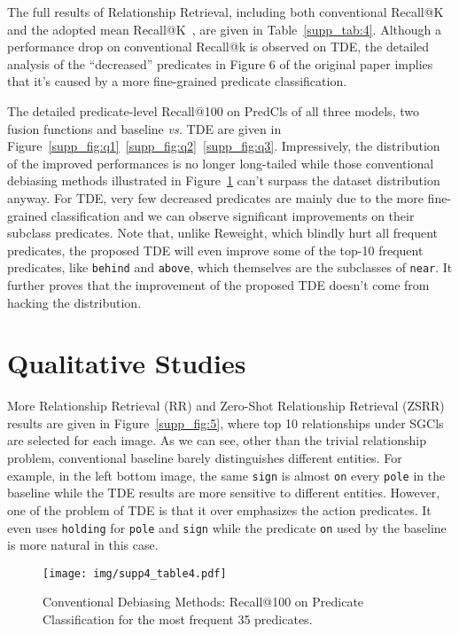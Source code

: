 \documentclass[10pt,twocolumn,letterpaper]{article}
\begin{document}
The full results of Relationship Retrieval, including both conventional Recall@K and the adopted mean Recall@K~\cite{tang2019learning, chen2019knowledge}, are given in Table~\ref{supp_tab:4}. Although a performance drop on conventional Recall@k is observed on TDE, the detailed analysis of the ``decreased'' predicates in Figure 6 of the original paper implies that it's caused by a more fine-grained predicate classification. 

The detailed predicate-level Recall@100 on PredCls of all three models, two fusion functions and baseline \textit{vs.} TDE are given in Figure~\ref{supp_fig:q1}~\ref{supp_fig:q2}~\ref{supp_fig:q3}. Impressively, the distribution of the improved performances is no longer long-tailed while those conventional debiasing methods illustrated in Figure~\ref{supp_fig:q4} can't surpass the dataset distribution anyway. For TDE, very few decreased predicates are mainly due to the more fine-grained classification and we can observe significant improvements on their subclass predicates. Note that, unlike Reweight, which blindly hurt all frequent predicates, the proposed TDE will even improve some of the top-10 frequent predicates, like \texttt{behind} and \texttt{above}, which themselves are the subclasses of \texttt{near}. It further proves that the improvement of the proposed TDE doesn't come from hacking the distribution.

\section{Qualitative Studies}
\label{sec:qualitative}
More Relationship Retrieval (RR) and Zero-Shot Relationship Retrieval (ZSRR) results are given in Figure~\ref{supp_fig:5}, where top 10 relationships under SGCls are selected for each image. As we can see, other than the trivial relationship problem, conventional baseline barely distinguishes different entities. For example, in the left bottom image, the same \texttt{sign} is almost \texttt{on} every \texttt{pole} in the baseline while the TDE results are more sensitive to different entities. However, one of the problem of TDE is that it over emphasizes the action predicates. It even uses \texttt{holding} for \texttt{pole} and \texttt{sign} while the predicate \texttt{on} used by the baseline is more natural in this case.  


\begin{figure}
   \begin{minipage}[b]{1\linewidth}
   \centerline{\texttt{[image: img/supp4\_table4.pdf]}}
   \end{minipage}
   \caption{Conventional Debiasing Methods: Recall@100 on Predicate Classification for the most frequent 35 predicates.}
   \label{supp_fig:q4} \end{figure}
\end{document}
